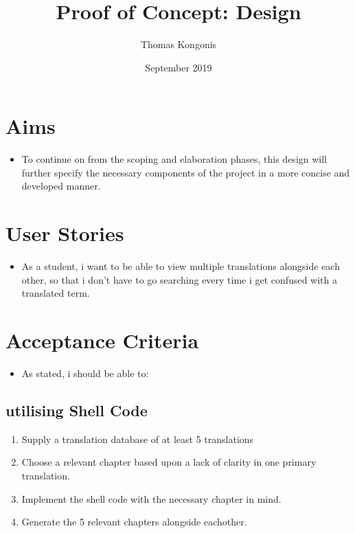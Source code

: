 \documentclass{article}
\title{Proof of Concept: Design}
\author{Thomas Kongonis}
\date{September 2019}
\begin{document}
\maketitle

\tableofcontents

\section{Aims}

\begin{itemize}

\item{To continue on from the scoping and elaboration phases, this design will further specify the necessary components of the project in a more concise and developed manner.}

\end{itemize}



\section{User Stories}


\begin{itemize}


\item{As a student, i want to be able to view multiple translations alongside each other, so that i don't have to go searching every time i get confused with a translated term.} 
    
    
    
\end{itemize}



\section{Acceptance Criteria}
\begin{itemize}
    \item{As stated, i should be able to:} 
\end{itemize}

\subsection{utilising Shell Code}

\begin{enumerate}

\item{Supply a translation database of at least 5 translations}

\item{Choose a relevant chapter based upon a lack of clarity in one primary translation.}

\item{Implement the shell code with the necessary chapter in mind.}

\item{Generate the 5 relevant chapters alongside eachother.}

\end{enumerate}
\end{document}
